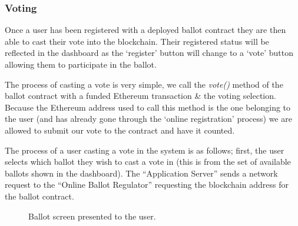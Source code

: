 \documentclass{article}
\begin{document}
\cleardoublepage
\subsubsection{Voting}
Once a user has been registered with a deployed ballot contract they are then able to cast their vote into the blockchain. Their registered status will be reflected in the dashboard as the `register' button will change to a `vote' button allowing them to participate in the ballot.

The process of casting a vote is very simple, we call the \textit{vote()} method of the ballot contract with a funded Ethereum transaction \& the voting selection. Because the Ethereum address used to call this method is the one belonging to the user (and has already gone through the `online registration' process) we are allowed to submit our vote to the contract and have it counted.

The process of a user casting a vote in the system is as follows; first, the user selects which ballot they wish to cast a vote in (this is from the set of available ballots shown in the dashboard). The ``Application Server'' sends a network request to the ``Online Ballot Regulator'' requesting the blockchain address for the ballot contract.


\begin{figure}[h]
	\noindent
	\caption{Ballot screen presented to the user.}
\end{figure}
\end{document}
